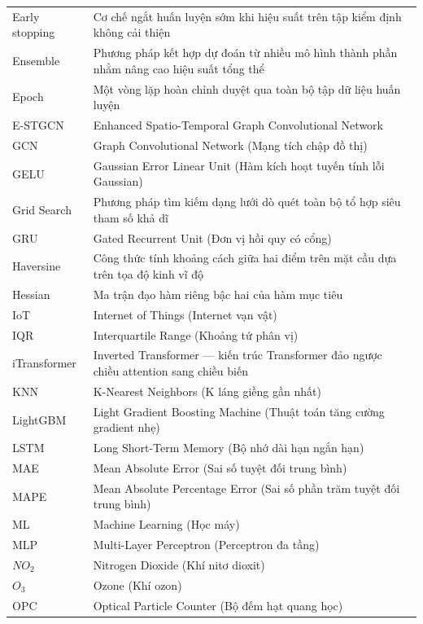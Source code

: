 \begin{center}
\begin{tabular}{p{3cm} p{11cm}}
    Early stopping & Cơ chế ngắt huấn luyện sớm khi hiệu suất trên tập kiểm định không cải thiện \\
    Ensemble  & Phương pháp kết hợp dự đoán từ nhiều mô hình thành phần nhằm nâng cao hiệu suất tổng thể \\
    Epoch     & Một vòng lặp hoàn chỉnh duyệt qua toàn bộ tập dữ liệu huấn luyện \\
    E-STGCN   & Enhanced Spatio-Temporal Graph Convolutional Network \\
    GCN       & Graph Convolutional Network (Mạng tích chập đồ thị) \\
    GELU      & Gaussian Error Linear Unit (Hàm kích hoạt tuyến tính lỗi Gaussian) \\
    Grid Search & Phương pháp tìm kiếm dạng lưới dò quét toàn bộ tổ hợp siêu tham số khả dĩ \\
    GRU       & Gated Recurrent Unit (Đơn vị hồi quy có cổng) \\
    Haversine & Công thức tính khoảng cách giữa hai điểm trên mặt cầu dựa trên tọa độ kinh vĩ độ \\
    Hessian   & Ma trận đạo hàm riêng bậc hai của hàm mục tiêu \\
    IoT       & Internet of Things (Internet vạn vật) \\
    IQR       & Interquartile Range (Khoảng tứ phân vị) \\
    iTransformer & Inverted Transformer --- kiến trúc Transformer đảo ngược chiều attention sang chiều biến \\
    KNN       & K-Nearest Neighbors (K láng giềng gần nhất) \\
    LightGBM  & Light Gradient Boosting Machine (Thuật toán tăng cường gradient nhẹ) \\
    LSTM      & Long Short-Term Memory (Bộ nhớ dài hạn ngắn hạn) \\
    MAE       & Mean Absolute Error (Sai số tuyệt đối trung bình) \\
    MAPE      & Mean Absolute Percentage Error (Sai số phần trăm tuyệt đối trung bình) \\
    ML        & Machine Learning (Học máy) \\
    MLP       & Multi-Layer Perceptron (Perceptron đa tầng) \\
    $NO_2$    & Nitrogen Dioxide (Khí nitơ dioxit) \\
    $O_3$     & Ozone (Khí ozon) \\
    OPC       & Optical Particle Counter (Bộ đếm hạt quang học) \\

\end{tabular}
\end{center}
